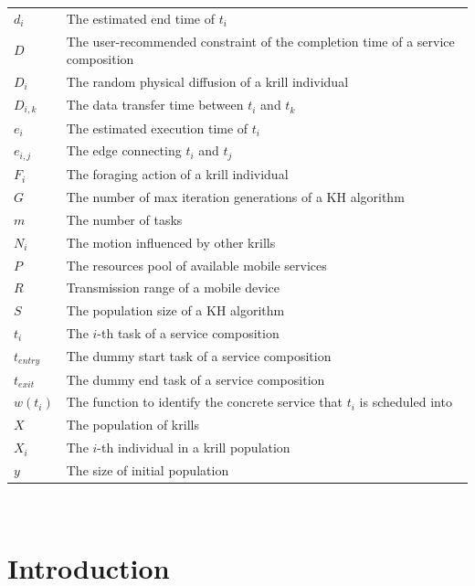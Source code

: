 \documentclass[journal]{IEEEtran}
\begin{document}
\noindent
\begin{tabular}{@{} l p{7.36cm} }
$d_i$         &   The estimated end time of $t_i$ \\
$D$           &   The user-recommended constraint of the completion time of a service composition \\
$D_i$         &   The random physical diffusion of a krill individual \\
$D_{i,k}$     &   The data transfer time between $t_i$ and $t_k$ \\
$e_i$         &   The estimated execution time of $t_i$ \\
$e_{i,j}$     &   The edge connecting $t_i$ and $t_j$ \\
$F_i$         &   The foraging action of a krill individual \\ 
$G$           &   The number of max iteration generations of a KH algorithm \\
$m$           &   The number of tasks \\
$N_i$         &   The motion influenced by other krills \\
$P$           &   The resources pool of available mobile services \\
$R$           &   Transmission range of a mobile device \\
$S$           &   The population size of a KH algorithm \\
$t_i$         &   The $i$-th task of a service composition \\
$t_{entry}$   &   The dummy start task of a service composition \\
$t_{exit}$    &   The dummy end task of a service composition \\
$w(t_i)$      &   The function to identify the concrete service that $t_i$ is scheduled into \\
$X$           &   The population of krills \\
$X_i$         &   The $i$-th individual in a krill population \\
$y$           &   The size of initial population
\end{tabular}
~\\

\IEEEpeerreviewmaketitle

\section{Introduction}
\end{document}
